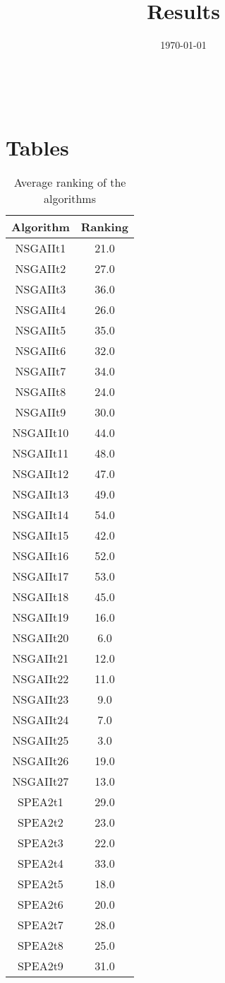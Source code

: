 \documentclass{article}
\title{Results}
\author{}
\date{\today}
\begin{document}
\oddsidemargin 0in \topmargin 0in\maketitle
\
\section{Tables}
\begin{table}[!htp]
\centering
\caption{Average ranking of the algorithms}
\begin{tabular}{c|c}
Algorithm&Ranking\\
\hline
NSGAIIt1&21.0\\
NSGAIIt2&27.0\\
NSGAIIt3&36.0\\
NSGAIIt4&26.0\\
NSGAIIt5&35.0\\
NSGAIIt6&32.0\\
NSGAIIt7&34.0\\
NSGAIIt8&24.0\\
NSGAIIt9&30.0\\
NSGAIIt10&44.0\\
NSGAIIt11&48.0\\
NSGAIIt12&47.0\\
NSGAIIt13&49.0\\
NSGAIIt14&54.0\\
NSGAIIt15&42.0\\
NSGAIIt16&52.0\\
NSGAIIt17&53.0\\
NSGAIIt18&45.0\\
NSGAIIt19&16.0\\
NSGAIIt20&6.0\\
NSGAIIt21&12.0\\
NSGAIIt22&11.0\\
NSGAIIt23&9.0\\
NSGAIIt24&7.0\\
NSGAIIt25&3.0\\
NSGAIIt26&19.0\\
NSGAIIt27&13.0\\
SPEA2t1&29.0\\
SPEA2t2&23.0\\
SPEA2t3&22.0\\
SPEA2t4&33.0\\
SPEA2t5&18.0\\
SPEA2t6&20.0\\
SPEA2t7&28.0\\
SPEA2t8&25.0\\
SPEA2t9&31.0\\

\end{tabular}
\end{table}
\end{document}
